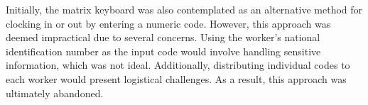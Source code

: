 Initially, the matrix keyboard was also contemplated as an alternative method for clocking in or out by entering a numeric 
code. However, this approach was deemed impractical due to several concerns. Using the worker's national identification 
number as the input code would involve handling sensitive information, which was not ideal. Additionally, distributing 
individual codes to each worker would present logistical challenges. As a result, this approach was ultimately abandoned.





